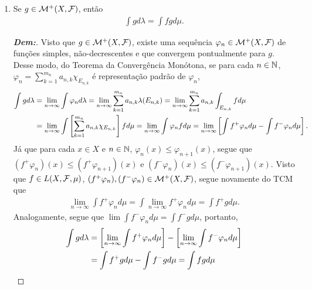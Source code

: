 {\begin{enumerate}[label=\alph*)]
\begin{proof}[\textbf{Dem:}]
\begin{align*}
        &= \lim_{m \rightarrow \infty} \sum_{k=1}^m \int f^+ \chi_{E_k} d\mu 
        = \sum_{k \in \bN} \int_{E_k} f^+ d\mu.
      \end{align*} 
      Com isso, 
      \begin{align*}
        \lambda\parth{\bigcup_{k \in \bN} E_k} = {\sum_{k \in \bN} \int_{E_k} f^+ d\mu}
        = \sum_{k \in \bN} \int_{E_k} f d\mu 
        = \sum_{k \in \bN} \lambda(E_k).
      \end{align*}
    \end{proof}
  \item Se $g \in \mathcal M^+ (X, \mathcal F)$, então 
    \begin{align*}
      \int g d\lambda = \int fgd\mu.
    \end{align*}
    \begin{proof}[\textbf{Dem:}] Visto que $g \in \mathcal M^+ (X, \mathcal F)$, existe 
      uma sequência $\varphi_n \in \mathcal M^+(X, \mathcal F)$ de funções simples, 
      não-decrescentes e que convergem pontualmente para $g$. Desse modo, 
      do Teorema da Convergência Monótona, se para cada $n \in \mathbb N$, 
      $\varphi_n = \sum_{k=1}^{m_n} a_{n, k} \chi_{E_{n, k}}$ 
      é representação padrão de $\varphi_n$,
      \begin{align*}
        \int g d\lambda &= \lim_{n \rightarrow \infty} \int \varphi_n d\lambda = 
        \lim_{n \rightarrow \infty} \sum_{k=1}^{m_n} a_{n, k}\lambda(E_{n, k})
        =\lim_{n \rightarrow \infty} \sum_{k=1}^{m_n} a_{n, k}\int_{E_{n, k}} f d\mu\\
        &= \lim_{n \rightarrow \infty} 
        \int \left[\sum_{k=1}^{m_n} a_{n, k}\chi_{E_{n, k}}\right]f d\mu
        = \lim_{n \rightarrow \infty} \int \varphi_n f d\mu 
        = \lim_{n \rightarrow \infty} \left[\int f^+ \varphi_n d\mu 
        - \int f^- \varphi_n d\mu\right].
      \end{align*}
      Já que para cada $x \in X$ e $n \in \mathbb N$, $\varphi_n(x) \le \varphi_{n+1}(x)$, 
      segue que $(f^+\varphi_n)(x)\le (f^+\varphi_{n+1})(x)$ e 
      $(f^-\varphi_n)(x) \le (f^- \varphi_{n+1})(x)$. Visto que $f \in L(X, \mathcal F, \mu)$,
      $(f^+\varphi_n), (f^-\varphi_n) \in \mathcal M^+(X, \mathcal F)$, segue novamente do TCM 
      que
      \begin{align*}
        \lim_{n \rightarrow \infty} \int f^+\varphi_n d\mu 
        = \int \lim_{n \rightarrow \infty} f^+\varphi_n d\mu = \int f^+g d\mu.
      \end{align*}
      Analogamente, segue que $\lim \int f^- \varphi_n d\mu = \int f^- g d\mu$, 
      portanto, 
      \begin{align*}
        \int g d\lambda &= \left[\lim_{n \rightarrow \infty} \int f^+\varphi_n d\mu\right]
        - \left[\lim_{n \rightarrow \infty} \int f^- \varphi_n d\mu\right]\\ 
        &= \int f^+gd\mu - \int f^-gd\mu = \int fgd\mu
      \end{align*}
    \end{proof}
\end{enumerate}}

